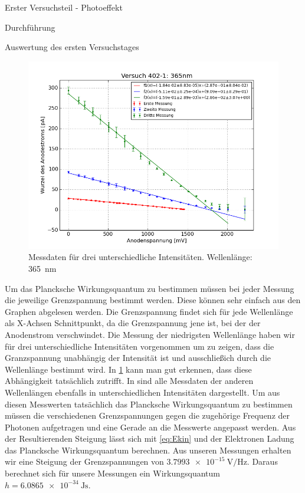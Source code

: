 \documentclass[pdftex, a4paper,11pt, twoside, ngerman]{report}
\begin{document}
\begin{chapter}{Erster Versuchsteil - Photoeffekt}
\begin{section}{Durchführung}
    \end{section}
    
    
    
    \begin{section}{Auswertung des ersten Versuchstages}
      \label{chp:Photoeffekt:sec:Auswertung}
      \begin{figure}[b!]
        \begin{center}
          \includegraphics[width=\textwidth]{Figures/Versuch402_1_365.png}
          \caption{Messdaten für drei unterschiedliche Intensitäten. Wellenlänge: \SI{365}{\nano\meter}}\label{fig:Versuch402_1_365}
        \end{center}
      \end{figure}
      Um das Plancksche Wirkungsquantum zu bestimmen müssen bei jeder Messung die jeweilige Grenzspannung bestimmt werden. Diese können sehr einfach aus den Graphen abgelesen werden. Die Grenzspannung findet sich für jede Wellenlänge als X-Achsen Schnittpunkt, da die Grenzspannung jene ist, bei der der Anodenstrom verschwindet. Die Messung der niedrigsten Wellenlänge haben wir für drei unterschiedliche Intensitäten vorgenommen um zu zeigen, dass die Granzspannung unabhängig der Intensität ist und ausschließich durch die Wellenlänge bestimmt wird. In \cref{fig:Versuch402_1_365} kann man gut erkennen, dass diese Abhängigkeit tatsächlich zutrifft. In  sind alle Messdaten der anderen Wellenlängen ebenfalls in unterschiedlichen Intensitäten dargestellt. Um aus diesen Messwerten tatsächlich das Plancksche Wirkungsquantum zu bestimmen müssen die verschiedenen Grenzspannungen gegen die zugehörige Frequenz der Photonen aufgetragen und eine Gerade an die Messwerte angepasst werden. Aus der Resultierenden Steigung lässt sich mit \cref{eq:Ekin} und der Elektronen Ladung das Plancksche Wirkungsquantum berechnen. Aus unseren Messungen erhalten wir eine Steigung der Grenzspannungen von $\SI{3.7993e-15}{\volt\per\hertz}$. Daraus berechnet sich für unsere Messungen ein Wirkungsquantum $h=\SI{6.0865e-34}{\joule\second}$. 
      

\end{section}
\end{chapter}
\end{document}
